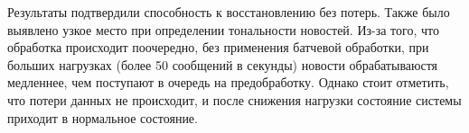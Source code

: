 Результаты подтвердили способность к восстановлению без потерь.
Также было выявлено узкое место при определении тональности новостей.
Из-за того, что обработка происходит поочередно, без применения батчевой обработки, при больших нагрузках (более 50 сообщений в секунды) новости обрабатываюстя медленнее, чем поступают в очередь на предобработку.
Однако стоит отметить, что потери данных не происходит, и после снижения нагрузки состояние системы приходит в нормальное состояние.
